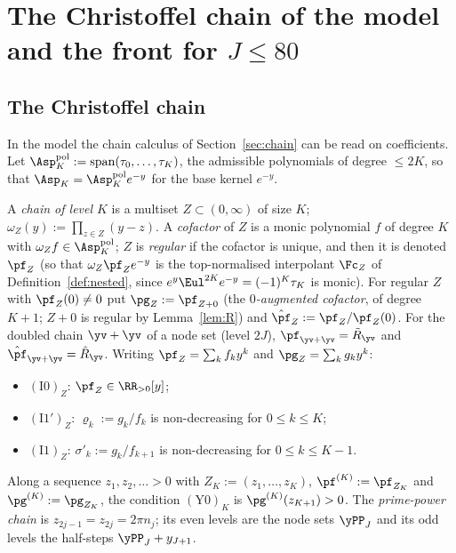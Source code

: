 \section{The Christoffel chain of the model and the front for \texorpdfstring{$J\le80$}{J <= 80}}\label{sec:model-chain}

\subsection{The Christoffel chain}\label{ssec:toy-chain}

In the model the chain calculus of Section~\ref{sec:chain} can be read on coefficients. Let
$\Asp^{\mathrm{pol}}_K:=\operatorname{span}(\tau_0,\dots,\tau_K)$, the admissible polynomials of degree $\le2K$, so that
$\Asp_K=\Asp^{\mathrm{pol}}_Ke^{-y}$ for the base kernel $e^{-y}$.

\begin{definition}\label{def:chain-laws}
A \emph{chain of level $K$} is a multiset $Z\subset(0,\infty)$ of size $K$; $\omega_Z(y):=\prod_{z\in Z}(y-z)$. A
\emph{cofactor} of $Z$ is a monic polynomial $f$ of degree $K$ with $\omega_Zf\in\Asp^{\mathrm{pol}}_K$; $Z$ is
\emph{regular} if the cofactor is unique, and then it is denoted $\pf_Z$ (so that $\omega_Z\pf_Ze^{-y}$ is the
top-normalised interpolant $\Fc_Z$ of Definition~\ref{def:nested}, since $e^{y}\Eul^{2K}e^{-y}=(-1)^K\tau_K$ is monic). For
regular $Z$ with $\pf_Z(0)\neq0$ put $\pg_Z:=\pf_{Z+0}$ (the \emph{$0$-augmented cofactor}, of degree $K+1$; $Z+0$ is regular
by Lemma~\ref{lem:R}) and $\hat{\pf}_Z:=\pf_Z/\pf_Z(0)$. For the doubled chain $\yv+\yv$ of a node set (level $2J$),
$\pf_{\yv+\yv}=\tilde R_{\yv}$ and $\hat{\pf}_{\yv+\yv}=\hat R_{\yv}$. Writing $\pf_Z=\sum_kf_ky^k$ and $\pg_Z=\sum_kg_ky^k$:
\begin{itemize}
\item $(\mathrm{I0})_Z$: $\pf_Z\in\RR_{>0}[y]$;
\item $(\mathrm{I1}')_Z$: $\varrho_k:=g_k/f_k$ is non-decreasing for $0\le k\le K$;
\item $(\mathrm{I1})_Z$: $\sigma'_k:=g_k/f_{k+1}$ is non-decreasing for $0\le k\le K-1$.
\end{itemize}
Along a sequence $z_1,z_2,\ldots>0$ with $Z_K:=(z_1,\dots,z_K)$, $\pf^{(K)}:=\pf_{Z_K}$ and $\pg^{(K)}:=\pg_{Z_K}$, the
condition $(\mathrm{Y0})_K$ is $\pg^{(K)}(z_{K+1})>0$. The \emph{prime-power chain} is $z_{2j-1}=z_{2j}=2\pi n_j$; its
even levels are the node sets $\yPP_J$ and its odd levels the half-steps $\yPP_J+y_{J+1}$.
\end{definition}

